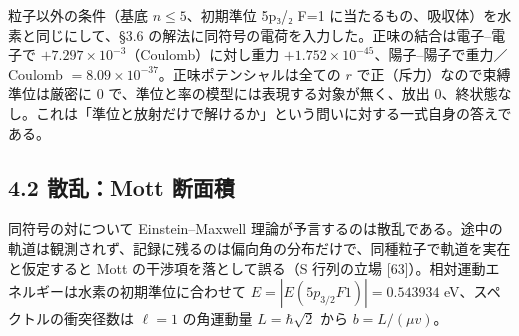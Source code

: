 \documentclass[
  a4paper,
]{ltjsarticle}
\begin{document}
粒子以外の条件（基底 \(n\le5\)、初期準位 5p₃/₂ F=1
に当たるもの、吸収体）を水素と同じにして、§3.6
の解法に同符号の電荷を入力した。正味の結合は電子--電子で
\(+7.297\times10^{-3}\)（Coulomb）に対し重力
\(+1.752\times10^{-45}\)、陽子--陽子で重力／Coulomb
\(=8.09\times10^{-37}\)。正味ポテンシャルは全ての \(r\)
で正（斥力）なので束縛準位は厳密に 0
で、準位と率の模型には表現する対象が無く、放出
0、終状態なし。これは「準位と放射だけで解けるか」という問いに対する一式自身の答えである。

\subsection{4.2 散乱：Mott
断面積}\label{ux6563ux4e71mott-ux65adux9762ux7a4d}

同符号の対について Einstein--Maxwell
理論が予言するのは散乱である。途中の軌道は観測されず、記録に残るのは偏向角の分布だけで、同種粒子で軌道を実在と仮定すると
Mott の干渉項を落として誤る（S 行列の立場
{[}63{]}）。相対運動エネルギーは水素の初期準位に合わせて
\(E=|E(5p_{3/2}F1)|=0.543934\) eV、スペクトルの衝突径数は \(\ell=1\)
の角運動量 \(L=\hbar\sqrt2\) から \(b=L/(\mu v)\)。
\end{document}
